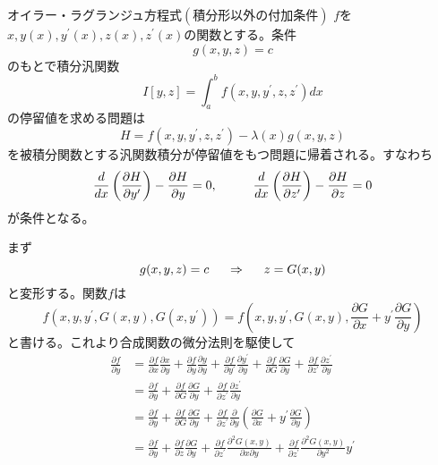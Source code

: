\documentclass{jsarticle}
\begin{document}
\begin{itembox}[l]{オイラー・ラグランジュ方程式\((積分形以外の付加条件)\)}
\(f\)を\(x,y(x),y^{\prime}(x),z(x),z^{\prime}(x)\)の関数とする。条件
\[g(x,y,z)=c\]
のもとで積分汎関数
\[I[y,z]=\int_{a}^{b}f(x,y,y^{\prime},z,z^{\prime})dx\]
の停留値を求める問題は
\[H=f(x,y,y^{\prime},z,z^{\prime})-\lambda(x)g(x,y,z)\]
を被積分関数とする汎関数積分が停留値をもつ問題に帰着される。すなわち
\[\frac{d}{dx}\left(\frac{\partial H}{\partial y^{\prime}}\right)-\frac{\partial H}{\partial y}=0,\hspace{10mm}\frac{d}{dx}\left(\frac{\partial H}{\partial z^{\prime}}\right)-\frac{\partial H}{\partial z}=0\]
が条件となる。
\end{itembox}
まず
\[g(x,y,z)=c\hspace{5mm}\Rightarrow\hspace{5mm}z=G(x,y)\]
と変形する。関数\(f\)は
\[f\left(x,y,y^{\prime},G(x,y),G(x,y^{\prime})\right)=f\left(x,y,y^{\prime},G(x,y),\frac{\partial G}{\partial x}+y^{\prime}\frac{\partial G}{\partial y}\right)\]
と書ける。これより合成関数の微分法則を駆使して
\begin{align*}
\frac{\partial f}{\partial y}&=\frac{\partial f}{\partial x}\frac{\partial x}{\partial y}+\frac{\partial f}{\partial y}\frac{\partial y}{\partial y}+\frac{\partial f}{\partial y^{\prime}}\frac{\partial y^{\prime}}{\partial y}+\frac{\partial f}{\partial G}\frac{\partial G}{\partial y}+\frac{\partial f}{\partial z^{\prime}}\frac{\partial z^{\prime}}{\partial y}\\
&=\frac{\partial f}{\partial y}+\frac{\partial f}{\partial G}\frac{\partial G}{\partial y}+\frac{\partial f}{\partial z^{\prime}}\frac{\partial z^{\prime}}{\partial y}\\
&=\frac{\partial f}{\partial y}+\frac{\partial f}{\partial G}\frac{\partial G}{\partial y}+\frac{\partial f}{\partial z^{\prime}}\frac{\partial}{\partial y}\left(\frac{\partial G}{\partial x}+y^{\prime}\frac{\partial G}{\partial y}\right)\\
&=\frac{\partial f}{\partial y}+\frac{\partial f}{\partial z}\frac{\partial G}{\partial y}+\frac{\partial f}{\partial z^{\prime}}\frac{\partial^{2}G(x,y)}{\partial x\partial y}+\frac{\partial f}{\partial z^{\prime}}\frac{\partial^{2}G(x,y)}{\partial y^{2}}y^{\prime}
\end{align*}
\end{document}
